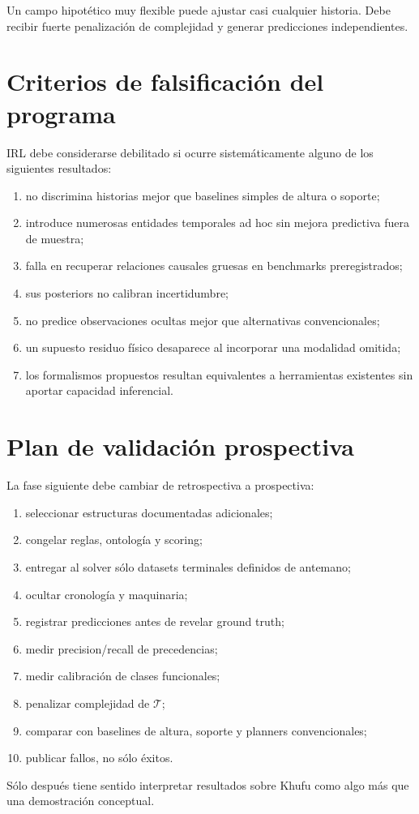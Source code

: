 Un campo hipotético muy flexible puede ajustar casi cualquier historia. Debe recibir fuerte penalización de complejidad y generar predicciones independientes.

\section{Criterios de falsificación del programa}

IRL debe considerarse debilitado si ocurre sistemáticamente alguno de los siguientes resultados:

\begin{enumerate}
\item no discrimina historias mejor que baselines simples de altura o soporte;
\item introduce numerosas entidades temporales ad hoc sin mejora predictiva fuera de muestra;
\item falla en recuperar relaciones causales gruesas en benchmarks preregistrados;
\item sus posteriors no calibran incertidumbre;
\item no predice observaciones ocultas mejor que alternativas convencionales;
\item un supuesto residuo físico desaparece al incorporar una modalidad omitida;
\item los formalismos propuestos resultan equivalentes a herramientas existentes sin aportar capacidad inferencial.
\end{enumerate}

\section{Plan de validación prospectiva}

La fase siguiente debe cambiar de retrospectiva a prospectiva:

\begin{enumerate}
\item seleccionar estructuras documentadas adicionales;
\item congelar reglas, ontología y scoring;
\item entregar al solver sólo datasets terminales definidos de antemano;
\item ocultar cronología y maquinaria;
\item registrar predicciones antes de revelar ground truth;
\item medir precision/recall de precedencias;
\item medir calibración de clases funcionales;
\item penalizar complejidad de \(\mathcal T\);
\item comparar con baselines de altura, soporte y planners convencionales;
\item publicar fallos, no sólo éxitos.
\end{enumerate}

Sólo después tiene sentido interpretar resultados sobre Khufu como algo más que una demostración conceptual.
